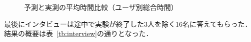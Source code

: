 \begin{figure}[ht]
	\begin{center}
		\caption{予測と実測の平均時間比較（ユーザ別総合時間）}
		\label{fig:compare4}
	\end{center}
\end{figure}

最後にインタビューは途中で実験が終了した3人を除く16名に答えてもらった．
結果の概要は表~\ref{tb:interview}の通りとなった．

